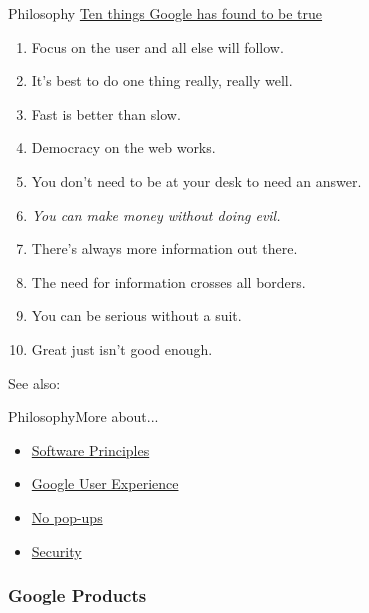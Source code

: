\begin{frame}{\googlelogo{} Philosophy}
  {\href{http://www.google.com/corporate/tenthings.html}{Ten things Google has found
      to be true}}

  \begin{enumerate}
  \item Focus on the user and all else will follow.
  \item It's best to do one thing really, really well.
  \item Fast is better than slow.
  \item Democracy on the web works.
  \item You don't need to be at your desk to need an answer.
  \item \emph{You can make money without doing evil.}
  \item There's always more information out there.
  \item The need for information crosses all borders.
  \item You can be serious without a suit.
  \item Great just isn't good enough.
  \end{enumerate}
\end{frame}

See also: 

\begin{frame}{\googlelogo{} Philosophy}{More about...}
  \begin{itemize}
  \item \href{http://www.google.com/corporate/software_principles.html}{Software Principles}
  \item \href{http://www.google.com/corporate/ux.html}{Google User Experience}
  \item \href{http://www.google.com/corporate/nopopupads.html}{No pop-ups}
  \item \href{http://www.google.com/corporate/security.html}{Security}
  \end{itemize}
\end{frame}

\subsubsection{Google Products}


